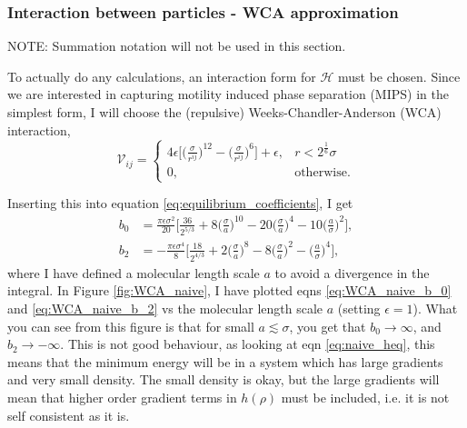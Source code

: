\documentclass{article}
\begin{document}
\subsubsection{Interaction between particles - WCA approximation}
NOTE: Summation notation will not be used in this section.

To actually do any calculations, an interaction form for $\mathcal{H}$ must be chosen. Since we
are interested in capturing motility induced phase separation (MIPS) in the simplest form, I
will choose the (repulsive) Weeks-Chandler-Anderson (WCA) interaction,
\begin{equation}
  \mathcal{V}_{ij} =
  \begin{cases}
    4\epsilon\bigg[\bigg(\frac{\sigma}{r^{ij}}\bigg)^{12}
    -\bigg(\frac{\sigma}{r^{ij}}\bigg)^6\bigg]+\epsilon, & r<2^{\frac{1}{6}}\sigma \\
    0, & \mathrm{otherwise}.
  \end{cases}
\end{equation}

Inserting this into equation \ref{eq:equilibrium_coefficients}, I get
\begin{subequations}
  \label{eq:WCA_naive}
  \begin{align}
    b_0 &= \frac{\pi\epsilon\sigma^2}{20}\bigg[\frac{36}{2^{5/3}}
          +8\bigg(\frac{\sigma}{a}\bigg)^{10}-20\bigg(\frac{\sigma}{a}\bigg)^4
          -10\bigg(\frac{a}{\sigma}\bigg)^2\bigg],\label{eq:WCA_naive_b_0}\\
    b_2 &= -\frac{\pi\epsilon\sigma^4}{8}\bigg[\frac{18}{2^{4/3}}
          +2\bigg(\frac{\sigma}{a}\bigg)^8-8\bigg(\frac{\sigma}{a}\bigg)^2
          -\bigg(\frac{a}{\sigma}\bigg)^4\bigg]\label{eq:WCA_naive_b_2},
  \end{align}
\end{subequations}
where I have defined a molecular length scale $a$ to avoid a divergence in the integral. In Figure
\ref{fig:WCA_naive}, I have plotted eqns \ref{eq:WCA_naive_b_0} and \ref{eq:WCA_naive_b_2} vs the
molecular length scale $a$ (setting $\epsilon=1$). What you can see from this figure is that for
small $a\lesssim\sigma$, you get that $b_0\to\infty$, and $b_2\to-\infty$. This is not good
behaviour, as looking at eqn \ref{eq:naive_heq}, this means that the minimum energy will be
in a system which has large gradients and very small density. The small density is okay, but the
large gradients will mean that higher order gradient terms in $h(\rho)$ must be included, i.e.
it is not self consistent as it is.
\end{document}
